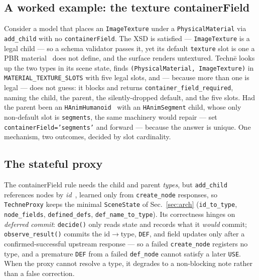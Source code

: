 \documentclass[sigconf,nonacm,screen,anonymous]{acmart}
\begin{document}
\subsection{A worked example: the texture containerField}
Consider a model that places an \texttt{ImageTexture} under a \texttt{PhysicalMaterial} via \texttt{add\_child} with no \texttt{containerField}. The XSD is satisfied --- \texttt{ImageTexture} is a legal child --- so a schema validator passes it, yet its default \texttt{texture} slot is one a PBR material~\cite{gltf} does not define, and the surface renders untextured. Technē looks up the two types in its scene state, finds \texttt{(PhysicalMaterial, ImageTexture)} in \texttt{MATERIAL\_TEXTURE\_SLOTS} with five legal slots, and --- because more than one is legal --- does not guess: it blocks and returns \texttt{container\_field\_required}, naming the child, the parent, the silently-dropped default, and the five slots. Had the parent been an \texttt{HAnimHumanoid}~\cite{hanim} with an \texttt{HAnimSegment} child, whose only non-default slot is \texttt{segments}, the same machinery would repair --- set \texttt{containerField='segments'} and forward --- because the answer is unique. One mechanism, two outcomes, decided by slot cardinality.

\subsection{The stateful proxy}
The containerField rule needs the child and parent \emph{types}, but \texttt{add\_child} references nodes by \emph{id}~\cite{x3duom}, learned only from \texttt{create\_node} responses, so \texttt{TechneProxy} keeps the minimal \texttt{SceneState} of Sec.~\ref{sec:arch} (\texttt{id\_to\_type}, \texttt{node\_fields}, \texttt{defined\_defs}, \texttt{def\_name\_to\_type}). Its correctness hinges on \emph{deferred commit}: \texttt{decide()} only reads state and records what it \emph{would} commit; \texttt{observe\_result()} commits the id$\rightarrow$type, \texttt{DEF}, and field updates only after a confirmed-successful upstream response --- so a failed \texttt{create\_node} registers no type, and a premature \texttt{DEF} from a failed \texttt{def\_node} cannot satisfy a later \texttt{USE}. When the proxy cannot resolve a type, it degrades to a non-blocking note rather than a false correction.
\end{document}
